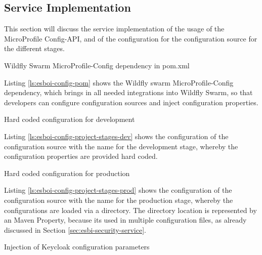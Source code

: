 \subsection{Service Implementation}
\label{sec:esbi-config-service}
This section will discuss the service implementation of the usage of the MicroProfile Config-API, and of the configuration for the configuration source for the different stages.  

\begin{listing}
	\caption{Wildfly Swarm MicroProfile-Config dependency in pom.xml}
	\label{ls:esboi-config-pom}
\end{listing}

Listing \vref{ls:esboi-config-pom} shows the Wildfly swarm MicroProfile-Config dependency, which brings in all needed integrations into Wildfly Swarm, so that developers can configure configuration sources and inject configuration properties.

\begin{listing}
	\caption{Hard coded configuration for development}
	\label{ls:esboi-config-project-stages-dev}
\end{listing}

Listing \vref{ls:esboi-config-project-stages-dev} shows the configuration of the configuration source with the name  for the development stage, whereby the configuration properties are provided hard coded.
\newpage

\begin{listing}
	\caption{Hard coded configuration for production}
	\label{ls:esboi-config-project-stages-prod}
\end{listing}

Listing \vref{ls:esboi-config-project-stages-prod} shows the configuration of the configuration source with the name  for the production stage, whereby the configurations are loaded via a directory. The directory location is represented by an Maven Property, because its used in multiple configuration files, as already discussed in Section \vref{sec:esbi-security-service}.


\begin{listing}
	\caption{Injection of Keycloak configuration parameters}
	\label{ls:esboi-config-inject}
\end{listing}

